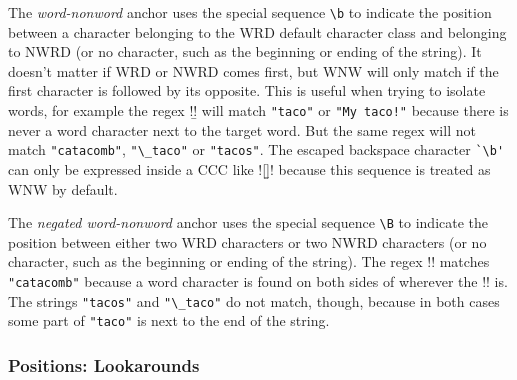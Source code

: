 \begin{description} \itemsep -1pt

\item[WNW:] The \emph{word-nonword} anchor uses the special sequence \verb!\b! to indicate the position between a character belonging to the WRD default character class and belonging to NWRD (or no character, such as the beginning or ending of the string).  It doesn't matter if WRD or NWRD comes first, but WNW will only match if the first character is followed by its opposite.  This is useful when trying to isolate words, for example the regex \cverb!\btaco\b! will match \verb!"taco"! or \verb|"My taco!"|  because there is never a word character next to the target word.  But the same regex will not match \verb!"catacomb"!, \verb!"\_taco"! or \verb!"tacos"!.  The escaped backspace character \verb!`\b'! can only be expressed inside a CCC like \cverb![\b]! because this sequence is treated as WNW by default.

\item[NWNW:] The \emph{negated word-nonword} anchor uses the special sequence \verb!\B! to indicate the position between either two WRD characters or two NWRD characters (or no character, such as the beginning or ending of the string).  The regex \cverb!\Btaco\B! matches \verb!"catacomb"! because a word character is found on both sides of wherever the \cverb!\B! is.  The strings \verb!"tacos"! and \verb!"\_taco"! do not match, though, because in both cases some part of \verb!"taco"! is next to the end of the string.
\end{description}

\subsubsection*{Positions: Lookarounds}

